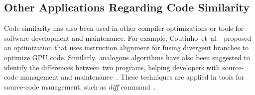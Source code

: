 \subsection{Other Applications Regarding Code Similarity}

Code similarity has also been used in other compiler optimizations or tools for
software development and maintenance.
For example, Coutinho~et~al.~\cite{coutinho11} proposed an optimization that uses
instruction alignment for fusing divergent branches to optimize GPU code.
Similarly, analogous algorithms have also been suggested to identify the
differences between two programs, helping developers with source-code
management and maintenance~\cite{yang91,miller85}.
These techniques are applied in tools for source-code management, such as
\textit{diff} command~\cite{miller85}.
